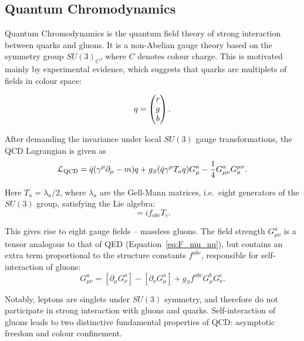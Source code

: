\newpage
\subsection{Quantum Chromodynamics}
\label{ss:QCD_theory}
Quantum Chromodynamics is the quantum field theory of strong interaction between quarks and gluons. It is a non-Abelian
gauge theory based on the symmetry group $SU(3)_C$, where $C$ denotes colour charge. This is motivated mainly by
experimental evidence, which suggests that quarks are multiplets of fields in colour space:

\begin{equation}
q = \begin{pmatrix} r \\ g \\ b \end{pmatrix}.
\end{equation} 

After demanding the invariance
under local $SU(3)$ gauge transformations, the QCD Lagrangian is given as
\begin{equation}
\label{eq:QCD_L}
\mathcal{L}_\textrm{QCD} = \bar{q} (\gamma^\mu \partial_\mu -m)q + g_S (\bar{q} \gamma^\mu T_a q) G^a_\mu -  \frac{1}{4} G^a_{\mu\nu}
G_a^{\mu\nu}.
\end{equation}

Here $T_a = \lambda_a / 2$, where $\lambda_a$ are the Gell-Mann matrices, i.e.\ eight generators of the $SU(3)$ group,
satisfying the Lie algebra:
\begin{equation}
[T_a,T_b] = i f_{abc} T_c.
\end{equation}

This gives rise to eight gauge fields -- massless gluons. The field strength $G^a_{\mu\nu}$ is a tensor analogous to
that of QED (Equation~\ref{eq:F_mu_nu}), but contains an extra term proportional to the structure constants $f^{abc}$,
responsible for self-interaction of gluons:
\begin{equation}
\label{eq:G_mu_nu}
G^a_{\mu\nu} = [\partial_\mu G^a_\nu] - [\partial_\nu G^a_\mu] + g_S f^{abc} G^b_\mu G^c_\nu.
\end{equation}

Notably, leptons are singlets under $SU(3)$ symmetry, and therefore do not participate in strong interaction with gluons
and quarks. Self-interaction of gluons leads to two distinctive fundamental properties of QCD: asymptotic freedom and
colour confinement.

